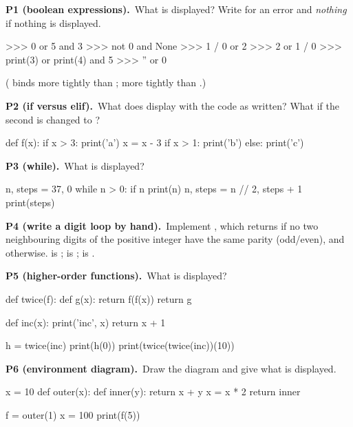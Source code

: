 \documentclass[10pt]{scrartcl}
\begin{document}
\begin{prob}\textbf{P1 (boolean expressions).}\ What is displayed? Write  for an error and \emph{nothing} if nothing is displayed.
\begin{py}
>>> 0 or 5 and 3
>>> not 0 and None
>>> 1 / 0 or 2
>>> 2 or 1 / 0
>>> print(3) or print(4) and 5
>>> '' or 0
\end{py}
( binds more tightly than ;  more tightly than .)
\end{prob}
\begin{prob}\textbf{P2 (if versus elif).}\ What does  display with the code as written? What if the second  is changed to ?
\begin{py}
def f(x):
    if x > 3:
        print('a')
        x = x - 3
    if x > 1:
        print('b')
    else:
        print('c')
\end{py}
\end{prob}
\begin{prob}\textbf{P3 (while).}\ What is displayed?
\begin{py}
n, steps = 37, 0
while n > 0:
    if n %
        print(n)
    n, steps = n // 2, steps + 1
print(steps)
\end{py}
\end{prob}
\begin{prob}\textbf{P4 (write a digit loop by hand).}\ Implement , which returns  if no two neighbouring digits of the positive integer  have the same parity (odd/even), and  otherwise.  is ;  is ;  is .
\end{prob}
\begin{prob}\textbf{P5 (higher-order functions).}\ What is displayed?
\begin{py}
def twice(f):
    def g(x):
        return f(f(x))
    return g

def inc(x):
    print('inc', x)
    return x + 1

h = twice(inc)
print(h(0))
print(twice(twice(inc))(10))
\end{py}
\end{prob}
\begin{prob}\textbf{P6 (environment diagram).}\ Draw the diagram and give what is displayed.
\begin{py}
x = 10
def outer(x):
    def inner(y):
        return x + y
    x = x * 2
    return inner

f = outer(1)
x = 100
print(f(5))
\end{py}
\end{prob}
\end{document}
